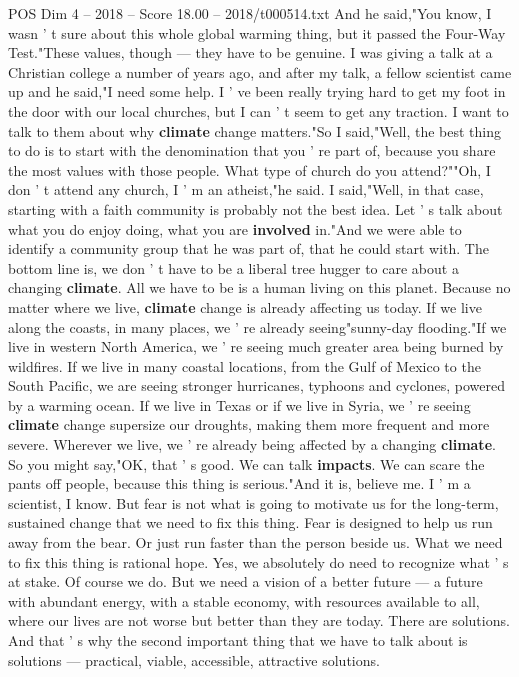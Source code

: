 \begin{textsample}{POS Dim 4 – 2018 – Score 18.00 – 2018/t000514.txt}
And he said,"You know, I wasn ' t sure about this whole global warming thing, but it passed the Four-Way Test."These values, though — they have to be genuine.
I was giving a talk at a Christian college a number of years ago, and after my talk, a fellow scientist came up and he said,"I need some help.
I ' ve been really trying hard to get my foot in the door with our local churches, but I can ' t seem to get any traction.
I want to talk to them about why \textbf{climate} change matters."So I said,"Well, the best thing to do is to start with the denomination that you ' re part of, because you share the most values with those people.
What type of church do you attend?""Oh, I don ' t attend any church, I ' m an atheist,"he said.
I said,"Well, in that case, starting with a faith community is probably not the best idea.
Let ' s talk about what you do enjoy doing, what you are \textbf{involved} in."And we were able to identify a community group that he was part of, that he could start with.
The bottom line is, we don ' t have to be a liberal tree hugger to care about a changing \textbf{climate}.
All we have to be is a human living on this planet.
Because no matter where we live, \textbf{climate} change is already affecting us today.
If we live along the coasts, in many places, we ' re already seeing"sunny-day flooding."If we live in western North America, we ' re seeing much greater area being burned by wildfires.
If we live in many coastal locations, from the Gulf of Mexico to the South Pacific, we are seeing stronger hurricanes, typhoons and cyclones, powered by a warming ocean.
If we live in Texas or if we live in Syria, we ' re seeing \textbf{climate} change supersize our droughts, making them more frequent and more severe.
Wherever we live, we ' re already being affected by a changing \textbf{climate}.
So you might say,"OK, that ' s good.
We can talk \textbf{impacts}.
We can scare the pants off people, because this thing is serious."And it is, believe me.
I ' m a scientist, I know.
But fear is not what is going to motivate us for the long-term, sustained change that we need to fix this thing.
Fear is designed to help us run away from the bear.
Or just run faster than the person beside us.
What we need to fix this thing is rational hope.
Yes, we absolutely do need to recognize what ' s at stake.
Of course we do.
But we need a vision of a better future — a future with abundant energy, with a stable economy, with resources available to all, where our lives are not worse but better than they are today.
There are solutions.
And that ' s why the second important thing that we have to talk about is solutions — practical, viable, accessible, attractive solutions.

\end{textsample}
